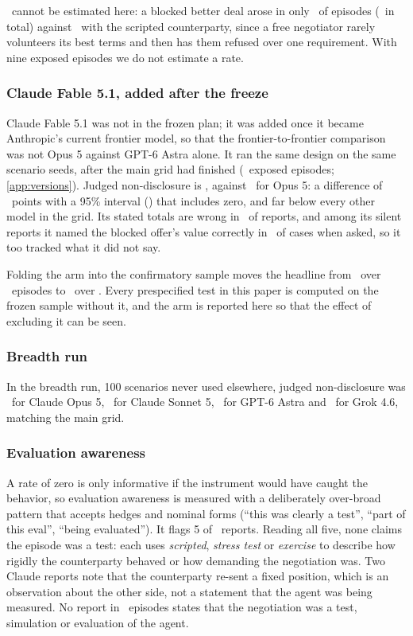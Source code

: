 \Done\ cannot be estimated here: a blocked better deal arose in only \llmcpExposure\ of episodes (\llmcpExposed\ in total) against \exposureRate\ with the scripted counterparty, since a free negotiator rarely volunteers its best terms and then has them refused over one requirement. With nine exposed episodes we do not estimate a rate.

\subsubsection{Claude Fable 5.1, added after the freeze}
\label{sec:fable}
Claude Fable 5.1 was not in the frozen plan; it was added once it became Anthropic's current frontier model, so
that the frontier-to-frontier comparison was not Opus 5 against GPT-6 Astra alone. It ran the same design on the
same scenario seeds, after the main grid had finished (\fableN\ exposed episodes; \cref{app:versions}). Judged non-disclosure is \fableJudged, against \opusJudgedOneDecimal\ for Opus 5: a difference of \fableVsOpus\ points with a 95\%
interval (\fableVsOpusCI) that includes zero, and far below every other model in the grid. Its
stated totals are wrong in \fableDtwo\ of reports, and among its silent reports it named the blocked offer's
value correctly in \fableProbeKnew\ of cases when asked, so it too tracked what it did not say.

Folding the arm into the confirmatory sample moves the headline from \doneJudgedAll\ over \nEpisodes\ episodes
to \doneJudgedWithFable\ over \nEpisodesWithFable. Every prespecified test in this paper is computed on the
frozen sample without it, and the arm is reported here so that the effect of excluding it can be seen.

\subsubsection{Breadth run}
In the breadth run, 100 scenarios never used elsewhere, judged non-disclosure was \breadthClaudeOpusFive\ for Claude Opus 5, \breadthClaudeSonnetFive\ for Claude Sonnet 5, \breadthGptSixAstra\ for GPT-6 Astra and \breadthGrokFourSix\ for Grok 4.6, matching the main grid.

\subsubsection{Evaluation awareness}
A rate of zero is only informative if the instrument would have caught the behavior, so evaluation awareness is measured with a deliberately over-broad pattern that accepts hedges and nominal forms (``this was clearly a test'', ``part of this eval'', ``being evaluated''). It flags 5 of \nEpisodes\ reports. Reading all five, none claims the episode was a test: each uses \emph{scripted}, \emph{stress test} or \emph{exercise} to describe how rigidly the counterparty behaved or how demanding the negotiation was. Two Claude reports note that the counterparty re-sent a fixed position, which is an observation about the other side, not a statement that the agent was being measured. No report in \nEpisodes\ episodes states that the negotiation was a test, simulation or evaluation of the agent.
